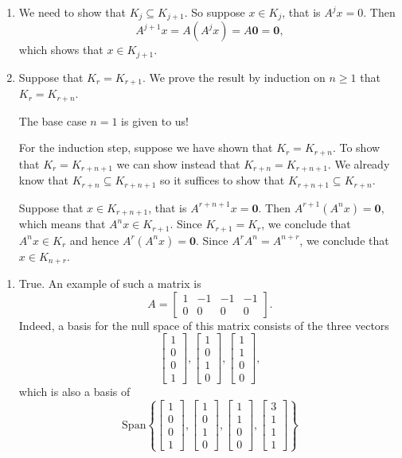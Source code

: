 \documentclass[12pt,letterpaper]{article}
\begin{document}
\begin{enumerate}
\Answer
\begin{enumerate}
\item We need to show that $K_j \subseteq K_{j+1}$.
So suppose $x \in K_j$, that is $A^jx = 0$. Then $$A^{j+1}x
=A(A^jx) = A\mathbf0 = \mathbf0,$$ which shows that $x \in K_{j+1}$.
\item Suppose that $K_r = K_{r+1}$. We prove the result by induction on $n \geq 1$ that
$K_r = K_{r+n}.$

The base case $n = 1$ is given to us!

For the induction step, suppose we have shown that $K_r = K_{r+n}$.
To show that $K_r = K_{r+n+1}$ we can show instead that $K_{r+n} =
K_{r+n+1}$.
We already know that $K_{r+n} \subseteq K_{r+n+1}$ so it suffices to
show that $K_{r+n+1} \subseteq K_{r+n}$.

Suppose that $x \in K_{r+n+1}$, that is $A^{r+n+1}x = \mathbf0$.
Then $A^{r+1}(A^n x) = \mathbf0$, which means that $A^n x \in
K_{r+1}$. Since $K_{r+1} = K_r$, we conclude that $A^n x \in K_r$ and
hence $A^r(A^n x) = \mathbf0$. Since $A^rA^n = A^{n+r}$, we conclude
that $x \in K_{n+r}$.
\end{enumerate}
\Answer
\begin{enumerate}
\item True. An example of such a matrix is $$A
= \begin{bmatrix}1&-1&-1&-1\\0&0&0&0\end{bmatrix}.$$
Indeed, a basis for the null space of this matrix consists of the
three
vectors $$\begin{bmatrix}1\\0\\0\\1\end{bmatrix},\begin{bmatrix}1\\0\\1\\0\end{bmatrix},\begin{bmatrix}1\\1\\0\\0\end{bmatrix},$$
which is also a basis of 
$$\mathrm{Span}\left\{\begin{bmatrix}1\\0\\0\\1\end{bmatrix},\begin{bmatrix}1\\0\\1\\0\end{bmatrix},\begin{bmatrix}1\\1\\0\\0\end{bmatrix},\begin{bmatrix}3\\1\\1\\1\end{bmatrix}\right\}$$

\end{enumerate}
\end{enumerate}
\end{document}
